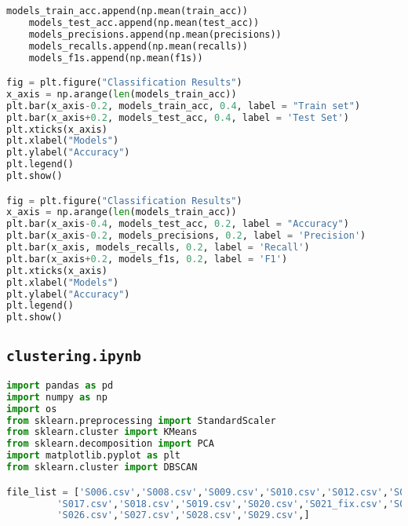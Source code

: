 \begin{lstlisting}[language=Python]
    models_train_acc.append(np.mean(train_acc))
    models_test_acc.append(np.mean(test_acc))
    models_precisions.append(np.mean(precisions))
    models_recalls.append(np.mean(recalls))
    models_f1s.append(np.mean(f1s))

fig = plt.figure("Classification Results")
x_axis = np.arange(len(models_train_acc))
plt.bar(x_axis-0.2, models_train_acc, 0.4, label = "Train set")
plt.bar(x_axis+0.2, models_test_acc, 0.4, label = 'Test Set')
plt.xticks(x_axis)
plt.xlabel("Models")
plt.ylabel("Accuracy")
plt.legend()
plt.show()

fig = plt.figure("Classification Results")
x_axis = np.arange(len(models_train_acc))
plt.bar(x_axis-0.4, models_test_acc, 0.2, label = "Accuracy")
plt.bar(x_axis-0.2, models_precisions, 0.2, label = 'Precision')
plt.bar(x_axis, models_recalls, 0.2, label = 'Recall')
plt.bar(x_axis+0.2, models_f1s, 0.2, label = 'F1')
plt.xticks(x_axis)
plt.xlabel("Models")
plt.ylabel("Accuracy")
plt.legend()
plt.show()
\end{lstlisting}

    \subsection{\texttt{clustering.ipynb}}
\begin{lstlisting}[language=Python]
import pandas as pd
import numpy as np
import os
from sklearn.preprocessing import StandardScaler
from sklearn.cluster import KMeans
from sklearn.decomposition import PCA
import matplotlib.pyplot as plt
from sklearn.cluster import DBSCAN

file_list = ['S006.csv','S008.csv','S009.csv','S010.csv','S012.csv','S013.csv','S014.csv','S015_fix.csv','S016.csv',
         'S017.csv','S018.csv','S019.csv','S020.csv','S021_fix.csv','S022.csv','S023_fix.csv','S024.csv','S025.csv',
         'S026.csv','S027.csv','S028.csv','S029.csv',]


\end{lstlisting}